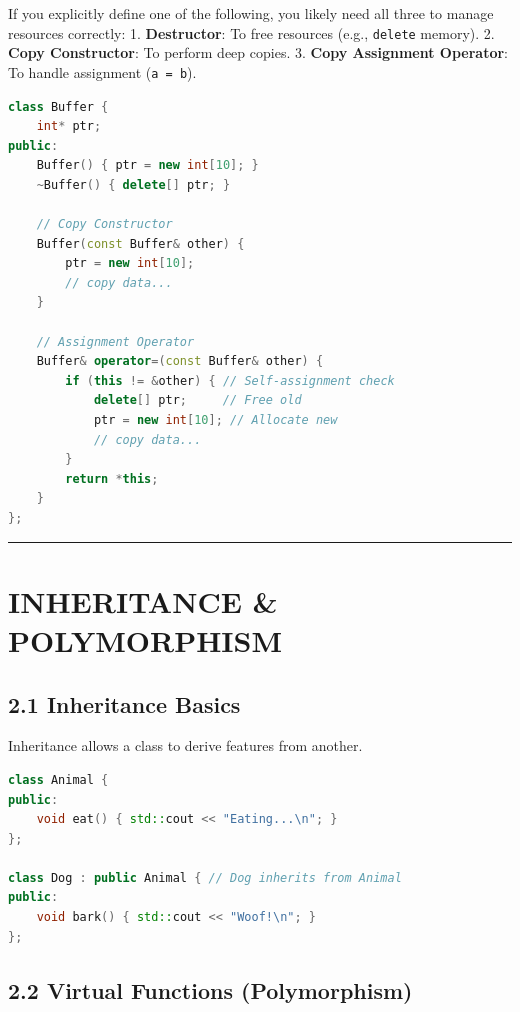 If you explicitly define one of the following, you likely need all three
to manage resources correctly: 1. \textbf{Destructor}: To free resources
(e.g., \passthrough{\lstinline!delete!} memory). 2. \textbf{Copy
Constructor}: To perform deep copies. 3. \textbf{Copy Assignment
Operator}: To handle assignment (\passthrough{\lstinline!a = b!}).

\begin{lstlisting}[language={C++}]
class Buffer {
    int* ptr;
public:
    Buffer() { ptr = new int[10]; }
    ~Buffer() { delete[] ptr; }

    // Copy Constructor
    Buffer(const Buffer& other) {
        ptr = new int[10];
        // copy data...
    }

    // Assignment Operator
    Buffer& operator=(const Buffer& other) {
        if (this != &other) { // Self-assignment check
            delete[] ptr;     // Free old
            ptr = new int[10]; // Allocate new
            // copy data...
        }
        return *this;
    }
};
\end{lstlisting}

\begin{center}\rule{0.5\linewidth}{0.5pt}\end{center}

\hypertarget{inheritance-polymorphism}{%
\section{INHERITANCE \& POLYMORPHISM}\label{inheritance-polymorphism}}

\hypertarget{inheritance-basics}{%
\subsection{2.1 Inheritance Basics}\label{inheritance-basics}}

Inheritance allows a class to derive features from another.

\begin{lstlisting}[language={C++}]
class Animal {
public:
    void eat() { std::cout << "Eating...\n"; }
};

class Dog : public Animal { // Dog inherits from Animal
public:
    void bark() { std::cout << "Woof!\n"; }
};
\end{lstlisting}

\hypertarget{virtual-functions-polymorphism}{%
\subsection{2.2 Virtual Functions
(Polymorphism)}\label{virtual-functions-polymorphism}}

